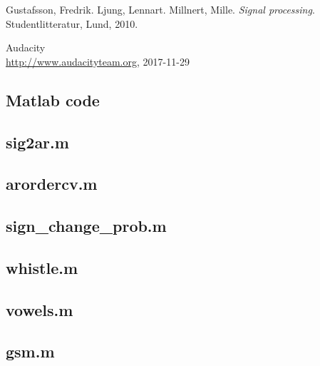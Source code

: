 \documentclass{IEEEtran}
\begin{document}
\newpage
\begin{thebibliography}{9}

  Gustafsson, Fredrik. Ljung, Lennart. Millnert, Mille.
  \textit{Signal processing}.
  Studentlitteratur, Lund,
  2010.

  Audacity \\
  \url{http://www.audacityteam.org},
  2017-11-29

\end{thebibliography}

\clearpage
\begin{appendices}

    \section{Matlab code}
    \subsection{sig2ar.m}\label{code:sig2ar}
    
    \subsection{arordercv.m}\label{code:arordercv}
    
    \subsection{sign\_change\_prob.m}\label{code:signchangeprob}
    
    \subsection{whistle.m}\label{code:whistle}
    
    \subsection{vowels.m}\label{code:vowels}
    
    \subsection{gsm.m}\label{code:gsm}
    
\end{appendices}
\end{document}
